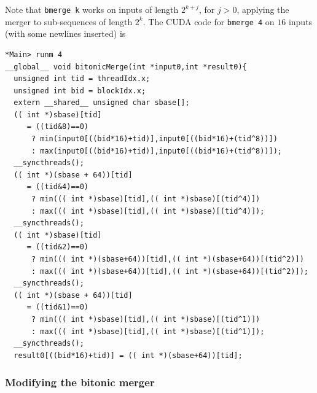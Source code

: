 \noindent
Note that {\tt bmerge k} works on inputs of length {\small }$2^{k+j}$, for $j > 0$, applying the merger to sub-sequences of length {\small $2^k$}.
The CUDA code for {\tt bmerge 4} on $16$ inputs
(with some newlines inserted) is
\begin{codesize}
\begin{verbatim}
*Main> runm 4
__global__ void bitonicMerge(int *input0,int *result0){
  unsigned int tid = threadIdx.x;
  unsigned int bid = blockIdx.x;
  extern __shared__ unsigned char sbase[];
  (( int *)sbase)[tid] 
     = ((tid&8)==0) 
      ? min(input0[((bid*16)+tid)],input0[((bid*16)+(tid^8))]) 
      : max(input0[((bid*16)+tid)],input0[((bid*16)+(tid^8))]);
  __syncthreads();
  (( int *)(sbase + 64))[tid] 
     = ((tid&4)==0) 
      ? min((( int *)sbase)[tid],(( int *)sbase)[(tid^4)]) 
      : max((( int *)sbase)[tid],(( int *)sbase)[(tid^4)]);
  __syncthreads();
  (( int *)sbase)[tid] 
     = ((tid&2)==0) 
      ? min((( int *)(sbase+64))[tid],(( int *)(sbase+64))[(tid^2)]) 
      : max((( int *)(sbase+64))[tid],(( int *)(sbase+64))[(tid^2)]);
  __syncthreads();
  (( int *)(sbase + 64))[tid] 
     = ((tid&1)==0) 
      ? min((( int *)sbase)[tid],(( int *)sbase)[(tid^1)]) 
      : max((( int *)sbase)[tid],(( int *)sbase)[(tid^1)]);
  __syncthreads();
  result0[((bid*16)+tid)] = (( int *)(sbase+64))[tid];
\end{verbatim}
\end{codesize}


\subsubsection{Modifying the bitonic merger}


